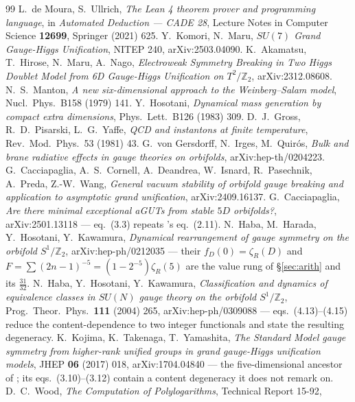 \documentclass[11pt,a4paper]{article}
\newcommand{\ZZ}{\mathbb{Z}}
\begin{document}
\begin{thebibliography}{99}\scriptsize
{} L.~de Moura, S.~Ullrich, \emph{The Lean 4 theorem prover and programming language}, in \emph{Automated Deduction --- CADE 28}, Lecture Notes in Computer Science \textbf{12699}, Springer (2021) 625.
\setlength{\itemsep}{-3pt}
 Y.~Komori, N.~Maru, \emph{$SU(7)$ Grand Gauge-Higgs Unification}, NITEP 240,
arXiv:2503.04090.
 K.~Akamatsu, T.~Hirose, N.~Maru, A.~Nago, \emph{Electroweak Symmetry Breaking in Two
Higgs Doublet Model from 6D Gauge-Higgs Unification on $T^2/\ZZ_2$}, arXiv:2312.08608.
 N.~S.~Manton, \emph{A new six-dimensional approach to the Weinberg--Salam model},
Nucl.\ Phys.\ B158 (1979) 141.
 Y.~Hosotani, \emph{Dynamical mass generation by compact extra dimensions},
Phys.\ Lett.\ B126 (1983) 309.
 D.~J.~Gross, R.~D.~Pisarski, L.~G.~Yaffe, \emph{QCD and instantons at finite
temperature}, Rev.\ Mod.\ Phys.\ 53 (1981) 43.
 G.~von Gersdorff, N.~Irges, M.~Quir\'os, \emph{Bulk and brane radiative effects in
gauge theories on orbifolds}, arXiv:hep-th/0204223.
 G.~Cacciapaglia, A.~S.~Cornell, A.~Deandrea, W.~Isnard, R.~Pasechnik, A.~Preda,
Z.-W.~Wang, \emph{General vacuum stability of orbifold gauge breaking and application to asymptotic
grand unification}, arXiv:2409.16137.
 G.~Cacciapaglia, \emph{Are there minimal exceptional aGUTs from stable $5D$
orbifolds?}, arXiv:2501.13118 --- eq.~(3.3) repeats \cite{CCD24}'s eq.~(2.11).
 N.~Haba, M.~Harada, Y.~Hosotani, Y.~Kawamura, \emph{Dynamical rearrangement of
gauge symmetry on the orbifold $S^1/\ZZ_2$}, arXiv:hep-ph/0212035 --- their $f_D(0)=\zeta_R(D)$ and
$F=\sum(2n-1)^{-5}=(1-2^{-5})\zeta_R(5)$ are the value rung of \S\ref{sec:arith} and its $\tfrac{31}{32}$.
 N.~Haba, Y.~Hosotani, Y.~Kawamura, \emph{Classification and dynamics of equivalence
classes in $SU(N)$ gauge theory on the orbifold $S^1/\ZZ_2$}, Prog.\ Theor.\ Phys.\ \textbf{111}
(2004) 265, arXiv:hep-ph/0309088 --- eqs.~(4.13)--(4.15) reduce the content-dependence to two
integer functionals and state the resulting degeneracy.
 K.~Kojima, K.~Takenaga, T.~Yamashita, \emph{The Standard Model gauge symmetry from
higher-rank unified groups in grand gauge-Higgs unification models}, JHEP \textbf{06} (2017) 018,
arXiv:1704.04840 --- the five-dimensional ancestor of \cite{KM25}; its eqs.~(3.10)--(3.12) contain a
content degeneracy it does not remark on.
 D.~C.~Wood, \emph{The Computation of Polylogarithms}, Technical Report 15-92,

\end{thebibliography}
\end{document}
